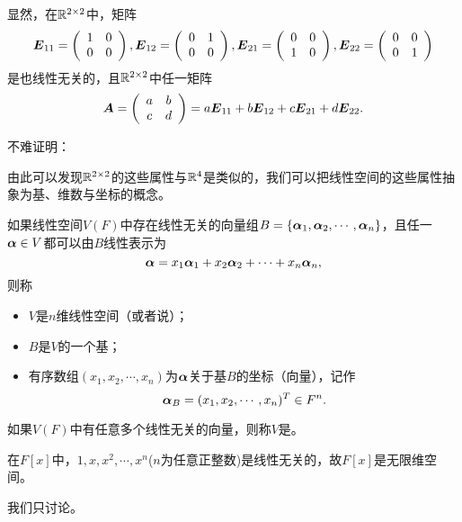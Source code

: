 \begin{frame}
显然，在$\mathbb R^{2\times 2}$中，矩阵
$$
\boldsymbol{E}_{11}=\left(\begin{array}{cc} 1&0\\0&0 \end{array}\right), 
\boldsymbol{E}_{12}=\left(\begin{array}{cc} 0&1\\0&0 \end{array}\right), 
\boldsymbol{E}_{21}=\left(\begin{array}{cc} 0&0\\1&0 \end{array}\right), 
\boldsymbol{E}_{22}=\left(\begin{array}{cc} 0&0\\0&1 \end{array}\right) 
$$
是也线性无关的，且$\mathbb R^{2\times 2}$中任一矩阵
$$
\boldsymbol{A} = \left(\begin{array}{cc} a&b\\c&d \end{array}\right)=a\boldsymbol{E}_{11}+b\boldsymbol{E}_{12}+c\boldsymbol{E}_{21}+d\boldsymbol{E}_{22}.
$$

\vspace{.1in}\pause 

不难证明：
\vspace{.1in}\pause 


由此可以发现$\mathbb R^{2\times 2}$的这些属性与$\mathbb R^4$是类似的，我们可以把线性空间的这些属性抽象为基、维数与坐标的概念。
\end{frame}

\begin{frame}
\begin{dingyi}
	如果线性空间$V(F)$中存在线性无关的向量组$B=\{\boldsymbol{\alpha}_1, \boldsymbol{\alpha}_2, \cdots, \boldsymbol{\alpha}_n\}$，且任一$\boldsymbol{\alpha}\in V$都可以由$B$线性表示为
	$$
	\boldsymbol{\alpha}=x_1\boldsymbol{\alpha}_1+x_2\boldsymbol{\alpha}_2+\cdots+x_n\boldsymbol{\alpha}_n,
	$$
	则称
	\begin{itemize}
	\item $V$是$n$维线性空间（或者说）；
	\item $B$是$V$的一个基；
	\item 有序数组$(x_1,x_2,\cdots,x_n)$为$\boldsymbol{\alpha}$关于基$B$的坐标（向量），记作
	$$
	\boldsymbol{\alpha}_B=(x_1,x_2,\cdots,x_n)^T\in F^n.
	$$
	\end{itemize}
    如果$V(F)$中有任意多个线性无关的向量，则称$V$是。
\end{dingyi}
\vspace{.1in}\pause 

\begin{li}
在$F[x]$中，$1,x,x^2,\cdots,x^n$($n$为任意正整数)是线性无关的，故$F[x]$是无限维空间。
\end{li}

我们只讨论。

\end{frame}

